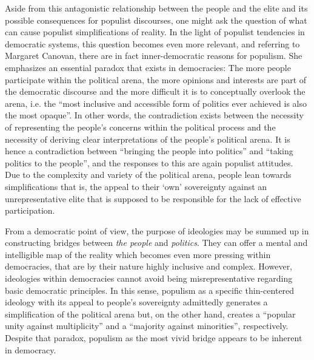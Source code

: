 \documentclass[a4paper]{scrreprt}
\begin{document}
Aside from this antagonistic relationship between the people and the elite and its possible consequences for populist discourses, one might ask the question of what can cause populist simplifications of reality. In the light of populist tendencies in democratic systems, this question becomes even more relevant, and referring to Margaret Canovan, there are in fact inner-democratic reasons for populism. She emphasizes an essential paradox that exists in democracies: The more people participate within the political arena, the more opinions and interests are part of the democratic discourse and the more difficult it is to conceptually overlook the arena, i.e. the ``most inclusive and accessible form of politics ever achieved is also the most opaque''. \cite[p.~25]{canovan:2002} In other words, the contradiction exists between the necessity of representing the people's concerns within the political process and the necessity of deriving clear interpretations of the people's political arena. It is hence a contradiction between ``bringing the people into politics'' and ``taking politics to the people'', and the responses to this are again populist attitudes. \cite[p.~26]{canovan:2002} Due to the complexity and variety of the political arena, people lean towards simplifications that is, the appeal to their `own' sovereignty against an unrepresentative elite that is supposed to be responsible for the lack of effective participation.\par
From a democratic point of view, the purpose of ideologies may be summed up in constructing bridges between {\em the people} and {\em politics}. They can offer a mental and intelligible map of the reality which becomes even more pressing within democracies, that are by their nature highly inclusive and complex. However, ideologies within democracies cannot avoid being misrepresentative regarding basic democratic principles. In this sense, populism as a specific thin-centered ideology with its appeal to people’s sovereignty admittedly generates a simplification of the political arena but, on the other hand, creates a ``popular unity against multiplicity'' and a ``majority against minorities'', respectively. \cite[p.~26]{canovan:2002} Despite that paradox, populism as the most vivid bridge appears to be inherent in democracy.
\end{document}
